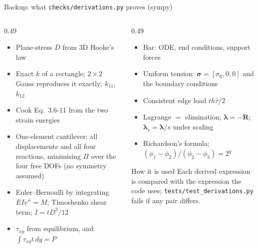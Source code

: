 \documentclass[aspectratio=169,10pt]{beamer}
\newcommand{\vR}{\mathbf R}
\newcommand{\vlam}{\bm{\lambda}}
\begin{document}
\begin{frame}{Backup: what \texttt{checks/derivations.py} proves (sympy)}
  \begin{columns}[T]
    \begin{column}{0.49\textwidth}
      \begin{itemize}
        \item Plane-stress $D$ from 3D Hooke's law
        \item Exact $k$ of a rectangle; $2\times2$ Gauss reproduces it exactly; $k_{11}$, $k_{12}$
        \item Cook Eq.~3.6-11 from the two strain energies
        \item One-element cantilever: all displacements and all four reactions, minimising $\Pi$ over the four
              free DOFs (no symmetry assumed)
        \item Euler--Bernoulli by integrating $EIv''=M$; Timoshenko shear term; $I=tD^3/12$
        \item $\tau_{xy}$ from equilibrium, and $\int\tau_{xy}t\,dy=P$
      \end{itemize}
    \end{column}
    \begin{column}{0.49\textwidth}
      \begin{itemize}
        \item Bar: ODE, end conditions, support forces
        \item Uniform tension: $\bm\sigma=[\sigma_0,0,0]$ and the boundary conditions
        \item Consistent edge load $th\bar\tau/2$
        \item Lagrange $=$ elimination; $\vlam=-\vR$; $\vlam_s=\vlam/s$ under scaling
        \item Richardson's formula; $(\phi_1-\phi_2)/(\phi_2-\phi_3)=2^q$
      \end{itemize}
      \vspace{0.5em}
      \begin{block}{How it is used}
        Each derived expression is compared with the expression the code uses;
        \texttt{tests/test\_derivations.py} fails if any pair differs.
      \end{block}
    \end{column}
  \end{columns}
\end{frame}
\end{document}
